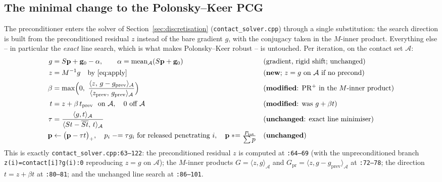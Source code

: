 \documentclass[11pt,a4paper]{article}
\newcommand{\pp}{\mathbf{p}}
\newcommand{\code}[1]{\texttt{#1}}
\theoremstyle{definition}
\theoremstyle{remark}
\begin{document}
\subsection{The minimal change to the Polonsky--Keer PCG}
\label{sec:pcg-change}

The preconditioner enters the solver of Section~\ref{sec:discretisation}
(\code{contact\_solver.cpp}) through a single substitution: the search direction
is built from the preconditioned residual $z$ instead of the bare gradient $g$,
with the conjugacy taken in the $M$-inner product. Everything else -- in
particular the \emph{exact} line search, which is what makes Polonsky--Keer robust
-- is untouched. Per iteration, on the contact set $\mathcal A$:
\begin{align}
  g &= S\pp + \mathbf g_0 - \alpha, \qquad
     \alpha=\operatorname{mean}_{\mathcal A}(S\pp+\mathbf g_0)
     &&\text{(gradient, rigid shift; unchanged)}\notag\\
  z &= M^{-1} g \quad\text{by \eqref{eq:apply}}
     &&\text{(\textbf{new}; $z=g$ on $\mathcal A$ if no precond)}\notag\\
  \beta &= \max\!\Big(0,\ \frac{\langle z,\,g-g_{\text{prev}}\rangle_{\mathcal A}}
                              {\langle z_{\text{prev}},\,g_{\text{prev}}\rangle_{\mathcal A}}\Big)
     &&\text{(\textbf{modified}: PR$^+$ in the $M$-inner product)}\notag\\
  t &= z + \beta\, t_{\text{prev}} \ \ \text{on }\mathcal A,\quad 0\text{ off }\mathcal A
     &&\text{(\textbf{modified}: was $g+\beta t$)}\notag\\
  \tau &= \frac{\langle g,t\rangle_{\mathcal A}}
              {\langle St-\overline{St},\,t\rangle_{\mathcal A}}
     &&\text{(\textbf{unchanged}: exact line minimiser)}\notag\\
  \pp &\leftarrow \big(\pp-\tau t\big)_+,\quad
       p_i \mathrel{-}=\tau g_i\ \text{for released penetrating }i,\quad
       \pp \mathrel{*}= \tfrac{P_{\text{tot}}}{\textstyle\sum p}
     &&\text{(\textbf{unchanged})}\notag
\end{align}
This is exactly \code{contact\_solver.cpp:63--122}: the preconditioned residual
$z$ is computed at \code{:64--69} (with the unpreconditioned branch
\code{z(i)=contact[i]?g(i):0} reproducing $z=g$ on $\mathcal A$); the $M$-inner
products $G=\langle z,g\rangle_{\mathcal A}$ and
$G_{\text{pr}}=\langle z,g-g_{\text{prev}}\rangle_{\mathcal A}$ at \code{:72--78};
the direction $t=z+\beta t$ at \code{:80--81}; and the unchanged line search at
\code{:86--101}.
\end{document}
